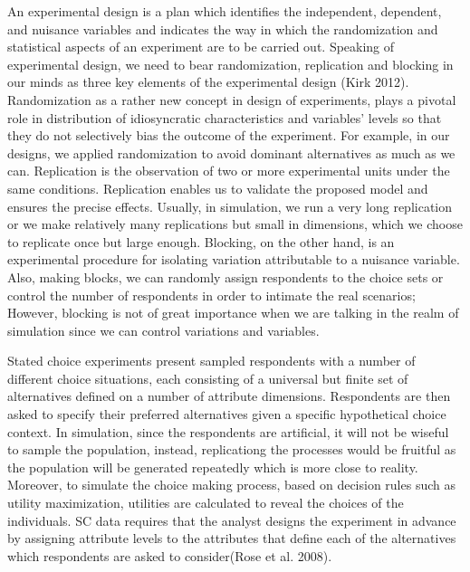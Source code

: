\documentclass[12pt,]{article}
\begin{document}
An experimental design is a plan which identifies the independent,
dependent, and nuisance variables and indicates the way in which the
randomization and statistical aspects of an experiment are to be carried
out. Speaking of experimental design, we need to bear randomization,
replication and blocking in our minds as three key elements of the
experimental design (Kirk 2012). Randomization as a rather new concept
in design of experiments, plays a pivotal role in distribution of
idiosyncratic characteristics and variables' levels so that they do not
selectively bias the outcome of the experiment. For example, in our
designs, we applied randomization to avoid dominant alternatives as much
as we can. Replication is the observation of two or more experimental
units under the same conditions. Replication enables us to validate the
proposed model and ensures the precise effects. Usually, in simulation,
we run a very long replication or we make relatively many replications
but small in dimensions, which we choose to replicate once but large
enough. Blocking, on the other hand, is an experimental procedure for
isolating variation attributable to a nuisance variable. Also, making
blocks, we can randomly assign respondents to the choice sets or control
the number of respondents in order to intimate the real scenarios;
However, blocking is not of great importance when we are talking in the
realm of simulation since we can control variations and variables.

Stated choice experiments present sampled respondents with a number of
different choice situations, each consisting of a universal but finite
set of alternatives defined on a number of attribute dimensions.
Respondents are then asked to specify their preferred alternatives given
a specific hypothetical choice context. In simulation, since the
respondents are artificial, it will not be wiseful to sample the
population, instead, replicationg the processes would be fruitful as the
population will be generated repeatedly which is more close to reality.
Moreover, to simulate the choice making process, based on decision rules
such as utility maximization, utilities are calculated to reveal the
choices of the individuals. SC data requires that the analyst designs
the experiment in advance by assigning attribute levels to the
attributes that define each of the alternatives which respondents are
asked to consider(Rose et al. 2008).
\end{document}
